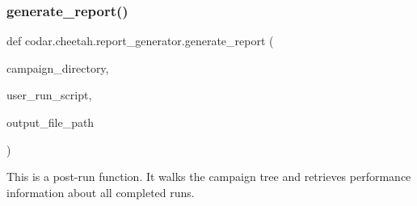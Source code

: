 \subsubsection{\texorpdfstring{generate\+\_\+report()}{generate\_report()}}
{\footnotesize\ttfamily def codar.\+cheetah.\+report\+\_\+generator.\+generate\+\_\+report (\begin{DoxyParamCaption}\item[{}]{campaign\+\_\+directory,  }\item[{}]{user\+\_\+run\+\_\+script,  }\item[{}]{output\+\_\+file\+\_\+path }\end{DoxyParamCaption})}

\begin{DoxyVerb}This is a post-run function.
It walks the campaign tree and retrieves performance information
about all completed runs.
\end{DoxyVerb}
 